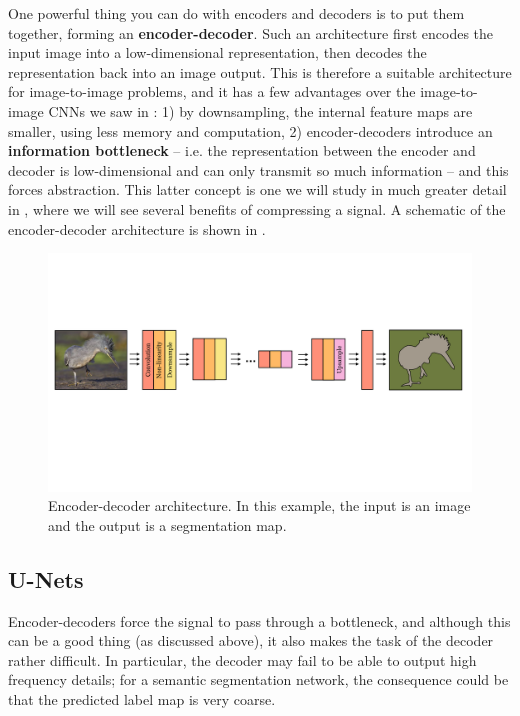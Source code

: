One powerful thing you can do with encoders and decoders is to put them together, forming an \textbf{encoder-decoder}. Such an architecture first encodes the input image into a low-dimensional representation, then decodes the representation back into an image output. This is therefore a suitable architecture for image-to-image problems, and it has a few advantages over the image-to-image CNNs we saw in \sect{\ref{sec:convolutional_neural_networks:spatial_outputs}}: 1) by downsampling, the internal feature maps are smaller, using less memory and computation, 2) encoder-decoders introduce an \textbf{information bottleneck} -- i.e. the representation between the encoder and decoder is low-dimensional and can only transmit so much information -- and this forces abstraction. This latter concept is one we will study in much greater detail in \chap{\ref{chapter:representation_learning}}, where we will see several benefits of compressing a signal. A schematic of the encoder-decoder architecture is shown in \fig{\ref{fig:convolutional_neural_nets:encoder_decoders}}.
\begin{figure}[h]
    \centerline{
    \includegraphics[width=1\linewidth]{./figures/convolutional_neural_nets/encoder_decoder_arch.pdf}
    }
    \caption{Encoder-decoder architecture. In this example, the input is an image and the output is a segmentation map.}
    \label{fig:convolutional_neural_nets:encoder_decoders}
\end{figure}

\subsection{U-Nets}\label{sec:convolutional_neural_nets:unet}
Encoder-decoders force the signal to pass through a bottleneck, and although this can be a good thing (as discussed above), it also makes the task of the decoder rather difficult. In particular, the decoder may fail to be able to output high frequency details; for a semantic segmentation network, the consequence could be that the predicted label map is very coarse.

